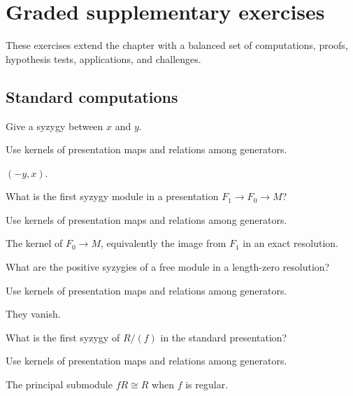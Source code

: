 \section{Graded supplementary exercises}
These exercises extend the chapter with a balanced set of computations, proofs, hypothesis tests, applications, and challenges.

\subsection*{Standard computations}

\begin{exercise}\label{exr:v24-expand-01}
Give a syzygy between $x$ and $y$.
\end{exercise}
\begin{hint}
Use kernels of presentation maps and relations among generators.
\end{hint}
\begin{solution}
$(-y,x)$.
\end{solution}

\begin{exercise}\label{exr:v24-expand-02}
What is the first syzygy module in a presentation $F_1\to F_0\to M$?
\end{exercise}
\begin{hint}
Use kernels of presentation maps and relations among generators.
\end{hint}
\begin{solution}
The kernel of $F_0\to M$, equivalently the image from $F_1$ in an exact resolution.
\end{solution}

\begin{exercise}\label{exr:v24-expand-03}
What are the positive syzygies of a free module in a length-zero resolution?
\end{exercise}
\begin{hint}
Use kernels of presentation maps and relations among generators.
\end{hint}
\begin{solution}
They vanish.
\end{solution}

\begin{exercise}\label{exr:v24-expand-04}
What is the first syzygy of $R/(f)$ in the standard presentation?
\end{exercise}
\begin{hint}
Use kernels of presentation maps and relations among generators.
\end{hint}
\begin{solution}
The principal submodule $fR\cong R$ when $f$ is regular.
\end{solution}

